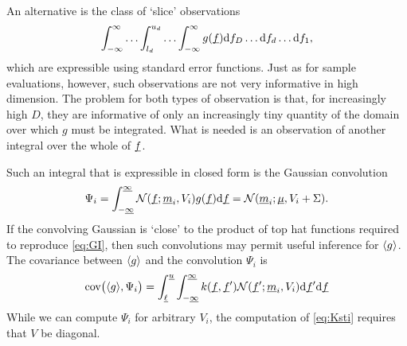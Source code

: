 \documentclass[twoside]{article}
\begin{document}
An alternative is the class of `slice' observations 
\begin{equation}
 \int_{-\infty}^{\infty} \ldots \int_{l_d}^{u_d} \ldots \int_{-\infty}^{\infty} g(\underline{\smash{f}}) \mathrm{d} f_D \ldots \mathrm{d} f_d\ldots \mathrm{d} f_1,
\end{equation}
which are expressible using standard error functions. Just as for sample evaluations, however, such observations are not very informative in high dimension. The problem for both types of observation is that, for increasingly high $D$, they are informative of only an increasingly tiny quantity of the domain over which $g$ must be integrated. What is needed is an observation of another integral over the whole of $\underline{\smash{f}}$.

Such an integral that is expressible in closed form is the Gaussian convolution
 \begin{equation}\label{eq:conv}
 \Psi_i = \int_{-\underline{\smash{\infty}}}^{\underline{\smash{\infty}}} \mathcal{N}(\underline{\smash{f}};\underline{\smash{m}}_i,V_i) g(\underline{\smash{f}}) \mathrm{d} \underline{\smash{f}} = \mathcal{N}(\underline{\smash{m}}_i;\underline{\smash{\mu}},V_i+\Sigma).
\end{equation}
 If the convolving Gaussian is `close' to the product of top hat functions required to reproduce \eqref{eq:GI}, then such convolutions may permit useful inference for $\langle g \rangle$. The covariance between $\langle g \rangle$ and the convolution $\Psi_i$ is
\begin{align}\label{eq:Ksti}
\text{cov}\bigl(\langle g \rangle, \Psi_i\bigr) =
\int_{\underline{\smash{\ell}}}^{\underline{\smash{u}}} \int_{-\underline{\smash{\infty}}}^{\underline{\smash{\infty}}}  k(\underline{\smash{f}}, \underline{\smash{f}}') \mathcal{N}(\underline{\smash{f}}';\underline{\smash{m}}_i,V_i) \mathrm{d} \underline{\smash{f}}' \mathrm{d} \underline{\smash{f}} 
\end{align}
While we can compute $\Psi_i$ for arbitrary $V_i$, the computation of \eqref{eq:Ksti} requires that $V$ be diagonal. 








\end{document}
